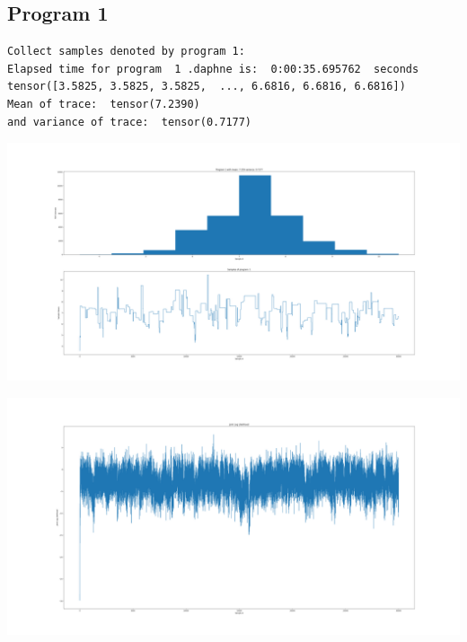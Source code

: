 \documentclass[]{article}
\begin{document}
\subsection{Program 1}
\begin{verbatim}
Collect samples denoted by program 1:
Elapsed time for program  1 .daphne is:  0:00:35.695762  seconds
tensor([3.5825, 3.5825, 3.5825,  ..., 6.6816, 6.6816, 6.6816])
Mean of trace:  tensor(7.2390)  
and variance of trace:  tensor(0.7177)
\end{verbatim}
\begin{center}
	\includegraphics[width=\linewidth]{Figures/p1_MHGibbs.png}
\end{center}
\begin{center}
	\includegraphics[width=\linewidth]{Figures/p1_MHGibbsjll.png}
\end{center}
\end{document}
